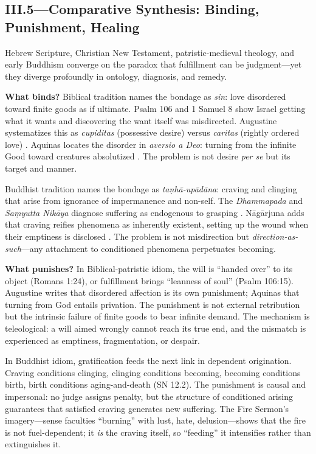 \subsection*{III.5—Comparative Synthesis: Binding, Punishment, Healing}
\label{ssec:iii-synthesis}

Hebrew Scripture, Christian New Testament, patristic-medieval theology, and early Buddhism
converge on the paradox that fulfillment can be judgment---yet they diverge profoundly in
ontology, diagnosis, and remedy.

\textbf{What binds?} Biblical tradition names the bondage as \emph{sin}: love disordered
toward finite goods as if ultimate. Psalm 106 and 1 Samuel 8 show Israel getting what it wants
and discovering the want itself was misdirected. Augustine systematizes this as
\emph{cupiditas} (possessive desire) versus \emph{caritas} (rightly ordered love)
\parencite{AugustineConfessions1998}. Aquinas locates the disorder in \emph{aversio a Deo}:
turning from the infinite Good toward creatures absolutized \parencite{AquinasST1947}. The
problem is not desire \emph{per se} but its target and manner.

Buddhist tradition names the bondage as \emph{taṇhā-upādāna}: craving and clinging that arise
from ignorance of impermanence and non-self. The \emph{Dhammapada} and \emph{Saṃyutta Nikāya}
diagnose suffering as endogenous to grasping \parencite{BodhiSN2000}. Nāgārjuna adds that
craving reifies phenomena as inherently existent, setting up the wound when their emptiness is
disclosed \parencite{NagarjunaMMK2013}. The problem is not misdirection but
\emph{direction-as-such}---any attachment to conditioned phenomena perpetuates becoming.

\textbf{What punishes?} In Biblical-patristic idiom, the will is ``handed over'' to its object
(Romans 1:24), or fulfillment brings ``leanness of soul'' (Psalm 106:15). Augustine writes
that disordered affection is its own punishment; Aquinas that turning from God entails
privation. The punishment is not external retribution but the intrinsic failure of finite goods
to bear infinite demand. The mechanism is teleological: a will aimed wrongly cannot reach its
true end, and the mismatch is experienced as emptiness, fragmentation, or despair.

In Buddhist idiom, gratification feeds the next link in dependent origination. Craving
conditions clinging, clinging conditions becoming, becoming conditions birth, birth conditions
aging-and-death (SN 12.2). The punishment is causal and impersonal: no judge assigns penalty,
but the structure of conditioned arising guarantees that satisfied craving generates new
suffering. The Fire Sermon's imagery---sense faculties ``burning'' with lust, hate,
delusion---shows that the fire is not fuel-dependent; it \emph{is} the craving itself, so
``feeding'' it intensifies rather than extinguishes it.

